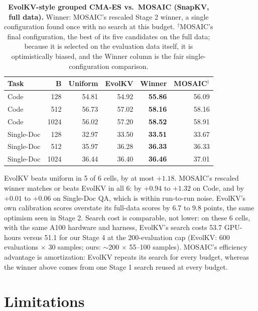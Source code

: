 \documentclass[11pt]{article}
\begin{document}
\begin{table}[t]
  \centering
  \footnotesize
  \setlength{\tabcolsep}{2.4pt}
  \begin{tabular}{@{} l r r r r r @{}}
    \toprule
    \textbf{Task} & \textbf{B} & \textbf{Uniform} & \textbf{EvolKV} & \textbf{Winner} & \textbf{MOSAIC}$^\dagger$ \\
    \midrule
    \rowcolor{gray!10}
    Code       & 128  & 54.81 & 54.92 & \textbf{55.86} & 56.09 \\
    Code       & 512  & 56.73 & 57.02 & \textbf{58.16} & 58.16 \\
    \rowcolor{gray!10}
    Code       & 1024 & 56.02 & 57.20 & \textbf{58.52} & 58.91 \\
    Single-Doc & 128  & 32.97 & 33.50 & \textbf{33.51} & 33.67 \\
    \rowcolor{gray!10}
    Single-Doc & 512  & 35.97 & 36.28 & \textbf{36.33} & 36.33 \\
    Single-Doc & 1024 & 36.44 & 36.40 & \textbf{36.46} & 37.01 \\
    \bottomrule
  \end{tabular}
  \caption{\textbf{EvolKV-style grouped CMA-ES vs.\ MOSAIC (SnapKV, full data).} Winner: MOSAIC's rescaled Stage 2 winner, a single configuration found once with no search at this budget. $^\dagger$MOSAIC's final configuration, the best of its five candidates on the full data; because it is selected on the evaluation data itself, it is optimistically biased, and the Winner column is the fair single-configuration comparison.}
  \label{tab:ablation}
\end{table}

EvolKV beats uniform in 5 of 6 cells, by at most $+1.18$. MOSAIC's rescaled winner matches or beats EvolKV in all 6: by $+0.94$ to $+1.32$ on Code, and by $+0.01$ to $+0.06$ on Single-Doc QA, which is within run-to-run noise. EvolKV's own calibration scores overstate its full-data scores by 6.7 to 9.8 points, the same optimism seen in Stage 2. Search cost is comparable, not lower: on these 6 cells, with the same A100 hardware and harness, EvolKV's search costs 53.7 GPU-hours versus 51.1 for our Stage 4 at the 200-evaluation cap (EvolKV: 600 evaluations $\times$ 30 samples; ours: $\sim$200 $\times$ 55--100 samples). MOSAIC's efficiency advantage is amortization: EvolKV repeats its search for every budget, whereas the winner above comes from one Stage 1 search reused at every budget.

\section{Limitations}
\end{document}
